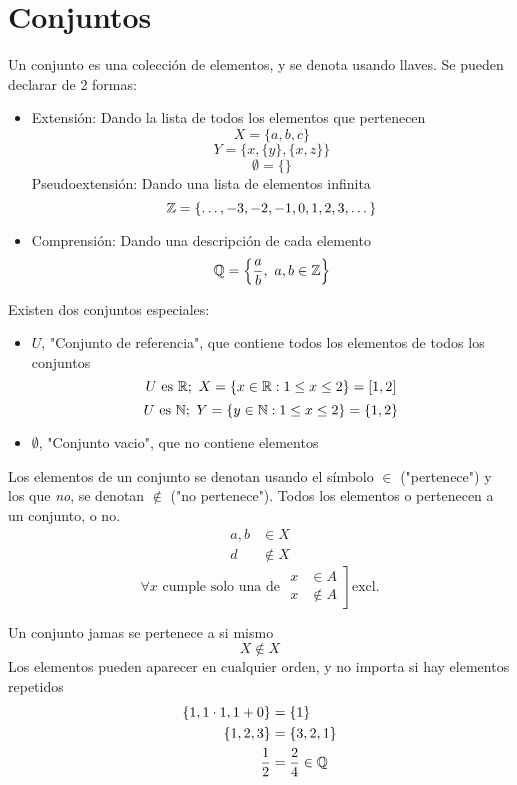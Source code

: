 \documentclass[../teoria.root.tex]{subfiles}
\begin{document}
\section{Conjuntos}
Un conjunto es una colección de elementos, y se denota usando llaves.
Se pueden declarar de 2 formas:
\begin{itemize}
    \item Extensión: Dando la lista de todos los elementos que pertenecen
          \[ X = \{a, b, c \} \]
          \[ Y = \{ x, \{y\}, \{x,z\} \} \]
          \[ \emptyset = \{\} \]
          \subitem Pseudoextensión: Dando una lista de elementos infinita
          \[ \mathbb{Z} = \{ \dots,-3,-2,-1,0,1,2,3,\dots \} \]
    \item Comprensión: Dando una descripción de cada elemento
          \[ \mathbb{Q} = \left\{\frac{a}{b},\ a,b \in \mathbb{Z} \right\}\]
\end{itemize}

Existen dos conjuntos especiales:
\begin{itemize}
    \item $U$, "Conjunto de referencia", que contiene todos los elementos de todos los conjuntos
          \[ \text{$U$ es $\mathbb{R}$};\ X = \{ x \in \mathbb{R}: 1 \leq x \leq 2 \} = [ 1, 2 ] \]
          \[ \text{$U$ es $\mathbb{N}$};\ Y = \{ y \in \mathbb{N}: 1 \leq x \leq 2 \} = \{ 1, 2\} \]
    \item $\emptyset$, "Conjunto vacio", que no contiene elementos
\end{itemize}

Los elementos de un conjunto se denotan usando el símbolo $\in$ ("pertenece")
y los que \textit{no}, se denotan $\notin$ ("no pertenece").
Todos los elementos o pertenecen a un conjunto, o no.
\begin{align*}
    a,b & \in X    \\
    d   & \notin X
\end{align*}
\[
    \forall x
    \text{ cumple solo una de }
    \left.
    \begin{array}{rl}
        x & \in A    \\
        x & \notin A
    \end{array}
    \right]
    \text{excl.}
\]

Un conjunto jamas se pertenece a si mismo
\[ X \notin X \]
Los elementos pueden aparecer en cualquier orden, y no importa si hay elementos repetidos
\begin{align*}
    \{ 1, 1\cdot1, 1+0 \} & = \{ 1 \}            \\
    \{ 1, 2, 3 \}         & = \{ 3, 2, 1 \}      \\
    \frac{1}{2}           & = \frac{2}{4} \in \mathbb{Q}
\end{align*}
\end{document}
